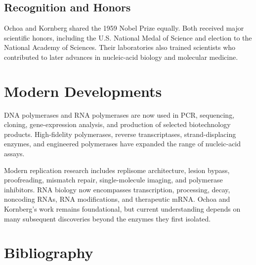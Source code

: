 \subsection{Recognition and Honors}

Ochoa and Kornberg shared the 1959 Nobel Prize equally. Both received major scientific honors, including the U.S. National Medal of Science and election to the National Academy of Sciences. Their laboratories also trained scientists who contributed to later advances in nucleic-acid biology and molecular medicine.

\section{Modern Developments}

DNA polymerases and RNA polymerases are now used in PCR, sequencing, cloning, gene-expression analysis, and production of selected biotechnology products. High-fidelity polymerases, reverse transcriptases, strand-displacing enzymes, and engineered polymerases have expanded the range of nucleic-acid assays.

Modern replication research includes replisome architecture, lesion bypass, proofreading, mismatch repair, single-molecule imaging, and polymerase inhibitors. RNA biology now encompasses transcription, processing, decay, noncoding RNAs, RNA modifications, and therapeutic mRNA. Ochoa and Kornberg's work remains foundational, but current understanding depends on many subsequent discoveries beyond the enzymes they first isolated.

\section{Bibliography}

